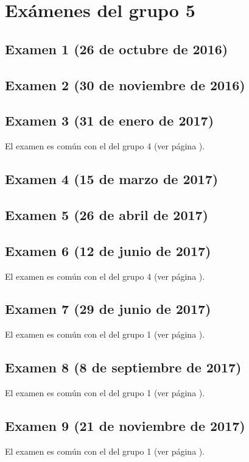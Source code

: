 \documentclass[a4paper,12pt,twoside]{book}
\begin{document}
\chapter{Exámenes del grupo 5}
\section{Examen 1 (26 de octubre de 2016)}
\section{Examen 2 (30 de noviembre de 2016)}
\section{Examen 3 (31 de enero de 2017)}
El examen es común con el del grupo 4 (ver página \pageref{examen_16_17_4_3}).
\section{Examen 4 (15 de marzo de 2017)}
\section{Examen 5 (26 de abril de 2017)}
\section{Examen 6 (12 de junio de 2017)} 
El examen es común con el del grupo 4 (ver página \pageref{examen_16_17_4_6}).
\section{Examen 7 (29 de junio de 2017)}
El examen es común con el del grupo 1 (ver página \pageref{examen_16_17_1_7}).
\section{Examen 8 (8 de septiembre de 2017)}
El examen es común con el del grupo 1 (ver página \pageref{examen_16_17_1_8}).
\section{Examen 9 (21 de noviembre de 2017)}
El examen es común con el del grupo 1 (ver página \pageref{examen_16_17_1_9}).
\end{document}
